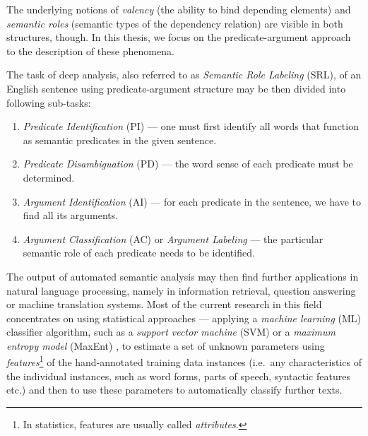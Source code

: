 \documentclass[12pt,notitlepage,a4paper]{report}
\begin{document}
The underlying notions of \emph{valency} (the ability to bind depending elements) and \emph{semantic roles} \citep[cf.\ e.g.][p.~123]{gildea02,carreras05,sgall86} (semantic types of the dependency relation) are visible in both structures, though. In this thesis, we focus on the predicate-argument approach to the description of these phenomena.

The task of deep analysis, also referred to as \emph{Semantic Role Labeling} (SRL), of an English sentence using predicate-argument structure may be then divided into following sub-tasks:
\begin{enumerate}
    \item \emph{Predicate Identification} (PI) --- one must first identify all words that function as semantic predicates in the given sentence.
    \item \emph{Predicate Disambiguation} (PD) --- the word sense of each predicate must be determined.
    \item \emph{Argument Identification}  (AI) --- for each predicate in the sentence, we have to find all its arguments.
    \item \emph{Argument Classification} (AC) or \emph{Argument Labeling} --- the particular semantic role of each predicate needs to be identified.
\end{enumerate}

The output of automated semantic analysis may then find further applications in natural language processing, namely in information retrieval, question answering or machine translation systems. Most of the current research in this field concentrates on using statistical approaches --- applying a \emph{machine learning} (ML) classifier algorithm, such as a \emph{support vector machine} (SVM) \citep{boser92} or a \emph{maximum entropy model} (MaxEnt) \citep{jelinek97}, to estimate a set of unknown parameters using \emph{features}\footnote{In statistics, features are usually called \emph{attributes}.} of the hand-annotated training data instances (i.e.\ any characteristics of the individual instances, such as word forms, parts of speech, syntactic features etc.) and then to use these parameters to automatically classify further texts.
\end{document}
